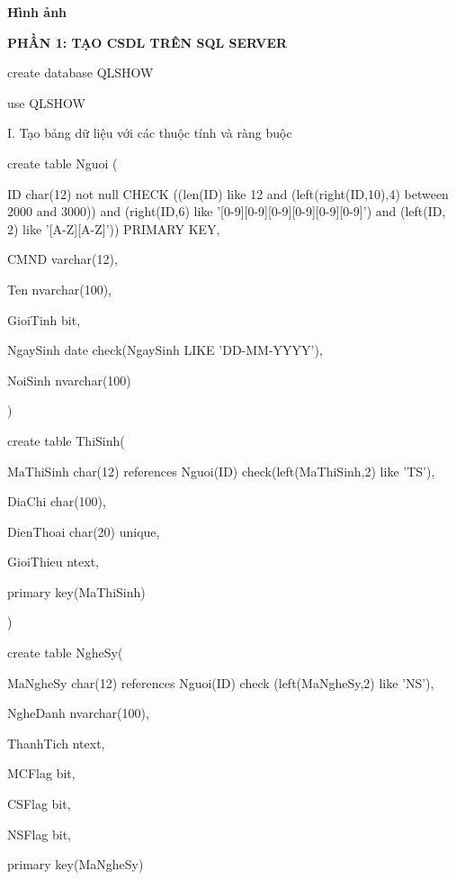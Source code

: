 \documentclass{report}
\begin{document}
\changefontsizes{14pt}
\bigskip
\textbf{Hình ảnh}

\bigskip
\changefontsizes{13pt}


\newpage
\changefontsizes{16pt}
\centerline{\textbf{PHẦN 1: TẠO CSDL TRÊN SQL SERVER}}

\bigskip
\changefontsizes{13pt}
\setlength{\parindent}{2cm}
create database QLSHOW

use QLSHOW

\bigskip
\setlength{\parindent}{0cm}
I. Tạo bảng dữ liệu với các thuộc tính và ràng buộc

\setlength{\parindent}{0.5cm}

create table Nguoi (
	
	\setlength{\parindent}{1.5cm}
	ID char(12) not null CHECK ((len(ID) like 12 and (left(right(ID,10),4) between 2000 and 3000)) and 
	(right(ID,6) like '[0-9][0-9][0-9][0-9][0-9][0-9]') and (left(ID, 2) like '[A-Z][A-Z]')) PRIMARY KEY,
	
	CMND varchar(12),
	
	Ten nvarchar(100),
	
	GioiTinh bit,
	
	NgaySinh date check(NgaySinh LIKE 'DD-MM-YYYY'),
	
	NoiSinh nvarchar(100)
	
	\setlength{\parindent}{0.5cm}
)

\bigskip

create table ThiSinh(

	\setlength{\parindent}{1.5cm}
	MaThiSinh char(12) references Nguoi(ID) check(left(MaThiSinh,2) like 'TS'),
	
	DiaChi char(100),
	
	DienThoai char(20) unique,
	
	GioiThieu ntext,
	
	primary key(MaThiSinh)
	
	\setlength{\parindent}{0.5cm}
)

\bigskip

create table NgheSy(

	\setlength{\parindent}{1.5cm}
	MaNgheSy char(12) references Nguoi(ID) check (left(MaNgheSy,2) like 'NS'),
	
	NgheDanh nvarchar(100),
	
	ThanhTich ntext,
	
	MCFlag bit,
	
	CSFlag bit,
	
	NSFlag bit,
	
	primary key(MaNgheSy)
	
\end{document}
